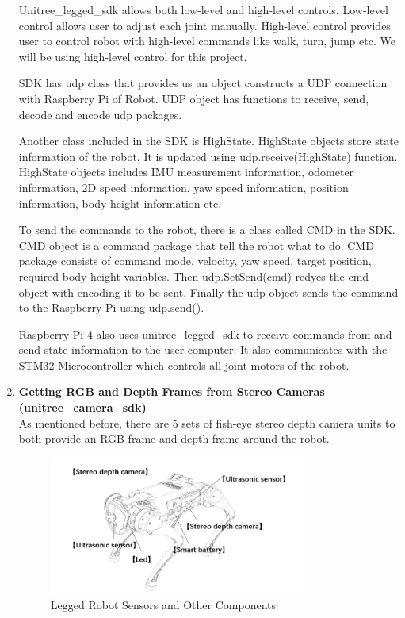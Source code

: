 \documentclass[12pt]{article}
\begin{document}
\begin{enumerate}
        Unitree\_legged\_sdk allows both low-level and high-level controls. Low-level control allows user to adjust each joint manually. High-level control provides user to control robot with high-level commands like walk, turn, jump etc. We will be using high-level control for this project. 

        SDK has udp class that provides us an object constructs a UDP connection with Raspberry Pi of Robot. UDP object has functions to receive, send, decode and encode udp packages. 

        Another class included in the SDK is HighState. HighState objects store state information of the robot. It is updated using udp.receive(HighState) function. HighState objects includes IMU measurement information, odometer information, 2D speed information, yaw speed information, position information, body height information etc. 

        To send the commands to the robot, there is a class called CMD in the SDK. CMD object is a command package that tell the robot what to do. CMD package consists of command mode, velocity, yaw speed, target position, required body height variables. Then udp.SetSend(cmd) redyes the cmd object  with encoding it to be sent. Finally the udp object sends the command to the Raspberry Pi using udp.send(). 

        Raspberry Pi 4 also uses unitree\_legged\_sdk to receive commands from and send state information to the user computer. It also communicates with the STM32 Microcontroller which controls all joint motors of the robot. 

        \item \textbf{Getting RGB and Depth Frames from Stereo Cameras (unitree\_camera\_sdk)} \\
        As mentioned before, there are 5 sets of fish-eye stereo depth camera units to both provide an RGB frame and depth frame around the robot.  

        \begin{figure}[H]
            \centering
            \includegraphics[width=0.8\textwidth]{RobotComponentLocations.jpeg}
            \caption{Legged Robot Sensors and Other Components}
        \end{figure}


\end{enumerate}
\end{document}
